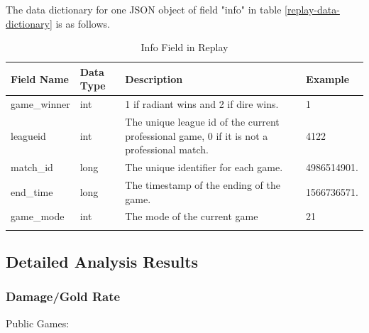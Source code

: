 \documentclass{article}
\begin{document}
The data dictionary for one JSON object of field "info" in table \ref{replay-data-dictionary} is as follows.

\begin{longtable}{|p{2.5cm}|p{2cm}|p{5.5cm}|p{3cm}|}

\hline
\textbf{Field Name} & \textbf{Data Type} & \textbf{Description}  & \textbf{Example} \\
\hline
\endhead

game\_winner & int & 1 if radiant wins and 2 if dire wins. & 1 \\
\hline
leagueid & int & The unique league id of the current professional game, 0 if it is not a professional match. & 4122 \\
\hline
match\_id & long & The unique identifier for each game. & 4986514901. \\
\hline
end\_time & long & The timestamp of the ending of the game. & 1566736571. \\
\hline
game\_mode & int & The mode of the current game & 21 \\
\hline
\caption{Info Field in Replay}
\label{info-field-in-replay}
\end{longtable}


\subsection{Detailed Analysis Results}

\subsubsection{Damage/Gold Rate}

Public Games:
\end{document}
